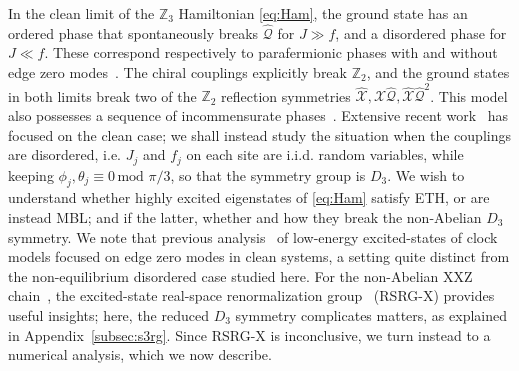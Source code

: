 \documentclass[prb,aps, twocolumn, superscriptaddress]{revtex4-1}
\newcommand{\tmod}[1]{\,\text{mod $#1$}}
\begin{document}
In the clean limit of the $\mathbb{Z}_3$ Hamiltonian \eqref{eq:Ham}, the ground state has an ordered phase that spontaneously breaks $\hat{\mathcal{Q}}$ for $J \gg f$, and a disordered phase for $J\ll f$. These correspond respectively to parafermionic phases with and without edge zero modes~\cite{AliceaFendleyReview}. The chiral couplings explicitly break $\mathbb{Z}_2$, and the ground states in both limits break two of the ${\mathbb{Z}_2}$ reflection symmetries ${\hat{\mathcal{X}}},{\hat{\mathcal{X}}\hat{\mathcal{Q}}}, {\hat{\mathcal{X}}\hat{\mathcal{Q}}}^2$.  This model also possesses a sequence of incommensurate phases~\cite{OstlundIncommensurate,HuseIncommensurate}. Extensive recent work~\cite{MotrukPara,BondesanQuellaParafermion,MengPara,BernevigPara,z3ChiralPD} has focused on the clean case; 
we shall  instead study the situation when the couplings are {disordered}, i.e. $J_j$ and $f_j$ on each site are i.i.d. random variables, while keeping $\phi_j, \theta_j \equiv 0 \tmod{\pi/3}$, so that the symmetry group is $D_3$. We wish to understand whether highly excited eigenstates of \eqref{eq:Ham} satisfy ETH, or are instead MBL; and if the latter, whether and how they break the non-Abelian $D_3$ symmetry. We note that previous analysis~\cite{JermynZMStab} of {low-energy excited-states} of clock models focused on edge zero modes in clean systems, a setting quite distinct from the {non-equilibrium} disordered case studied here. For the non-Abelian XXZ chain~\cite{XXZPaper}, the excited-state real-space renormalization group~\cite{PekkerRSRGX} (RSRG-X) provides useful insights; here, the reduced $D_3$ symmetry complicates matters, as explained in Appendix~\ref{subsec:s3rg}. Since RSRG-X is inconclusive, we turn instead to a numerical analysis, which we now describe.
\end{document}
